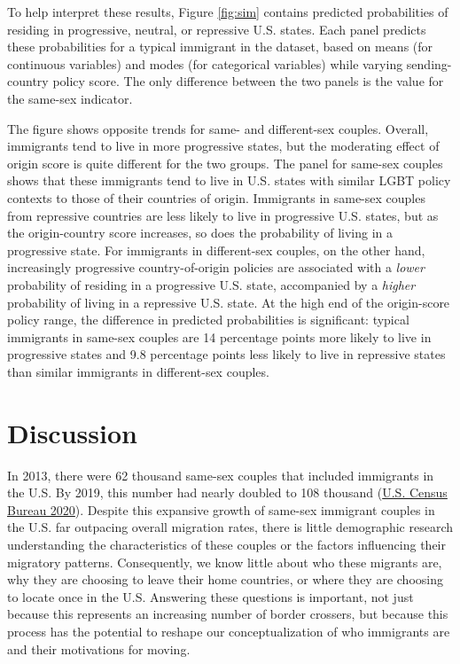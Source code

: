 \documentclass[
  11pt,
]{article}
\begin{document}
To help interpret these results, Figure \ref{fig:sim} contains predicted probabilities of residing in progressive, neutral, or repressive U.S. states. Each panel predicts these probabilities for a typical immigrant in the dataset, based on means (for continuous variables) and modes (for categorical variables) while varying sending-country policy score. The only difference between the two panels is the value for the same-sex indicator.

The figure shows opposite trends for same- and different-sex couples. Overall, immigrants tend to live in more progressive states, but the moderating effect of origin score is quite different for the two groups. The panel for same-sex couples shows that these immigrants tend to live in U.S. states with similar LGBT policy contexts to those of their countries of origin. Immigrants in same-sex couples from repressive countries are less likely to live in progressive U.S. states, but as the origin-country score increases, so does the probability of living in a progressive state. For immigrants in different-sex couples, on the other hand, increasingly progressive country-of-origin policies are associated with a \emph{lower} probability of residing in a progressive U.S. state, accompanied by a \emph{higher} probability of living in a repressive U.S. state. At the high end of the origin-score policy range, the difference in predicted probabilities is significant: typical immigrants in same-sex couples are 14 percentage points more likely to live in progressive states and 9.8 percentage points less likely to live in repressive states than similar immigrants in different-sex couples.

\hypertarget{discussion}{%
\section{Discussion}\label{discussion}}

In 2013, there were 62 thousand same-sex couples that included immigrants in the U.S. By 2019, this number had nearly doubled to 108 thousand (\protect\hyperlink{ref-u.s.censusbureau_2020}{U.S. Census Bureau 2020}). Despite this expansive growth of same-sex immigrant couples in the U.S. far outpacing overall migration rates, there is little demographic research understanding the characteristics of these couples or the factors influencing their migratory patterns. Consequently, we know little about who these migrants are, why they are choosing to leave their home countries, or where they are choosing to locate once in the U.S. Answering these questions is important, not just because this represents an increasing number of border crossers, but because this process has the potential to reshape our conceptualization of who immigrants are and their motivations for moving.
\end{document}
